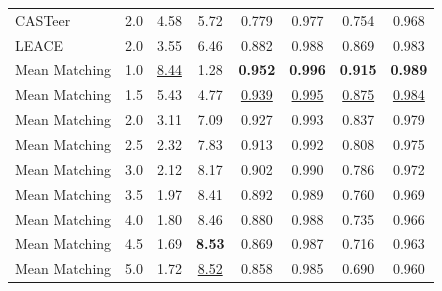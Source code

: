 \begin{table}[htbp]
\begin{tabular}{l|l|cccccc|}
CASTeer & 2.0 & 4.58 & 5.72 & 0.779 & 0.977 & 0.754 & 0.968 \\
LEACE & 2.0 & 3.55 & 6.46 & 0.882 & 0.988 & 0.869 & 0.983 \\
Mean Matching & 1.0 & \underline{8.44} & 1.28 & \textbf{0.952} & \textbf{0.996} & \textbf{0.915} & \textbf{0.989} \\
Mean Matching & 1.5 & 5.43 & 4.77 & \underline{0.939} & \underline{0.995} & \underline{0.875} & \underline{0.984} \\
Mean Matching & 2.0 & 3.11 & 7.09 & 0.927 & 0.993 & 0.837 & 0.979 \\
Mean Matching & 2.5 & 2.32 & 7.83 & 0.913 & 0.992 & 0.808 & 0.975 \\
Mean Matching & 3.0 & 2.12 & 8.17 & 0.902 & 0.990 & 0.786 & 0.972 \\
Mean Matching & 3.5 & 1.97 & 8.41 & 0.892 & 0.989 & 0.760 & 0.969 \\
Mean Matching & 4.0 & 1.80 & 8.46 & 0.880 & 0.988 & 0.735 & 0.966 \\
Mean Matching & 4.5 & 1.69 & \textbf{8.53} & 0.869 & 0.987 & 0.716 & 0.963 \\
Mean Matching & 5.0 & 1.72 & \underline{8.52} & 0.858 & 0.985 & 0.690 & 0.960 \\
\hline
\end{tabular}
\end{table}

